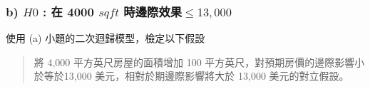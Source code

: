 \begin{frame}
    \frametitle{b) $H0$ : 在 4000 $sqft$ 時邊際效果$\le 13,000$}
    
    使用 (a) 小題的二次迴歸模型，檢定以下假設
    \begin{quote}
        將 4,000 平方英尺房屋的面積增加 100 平方英尺，對預期房價的邊際影響小於等於13,000 美元，相對於期邊際影響將大於 13,000 美元的對立假設。
    \end{quote}
\end{frame}